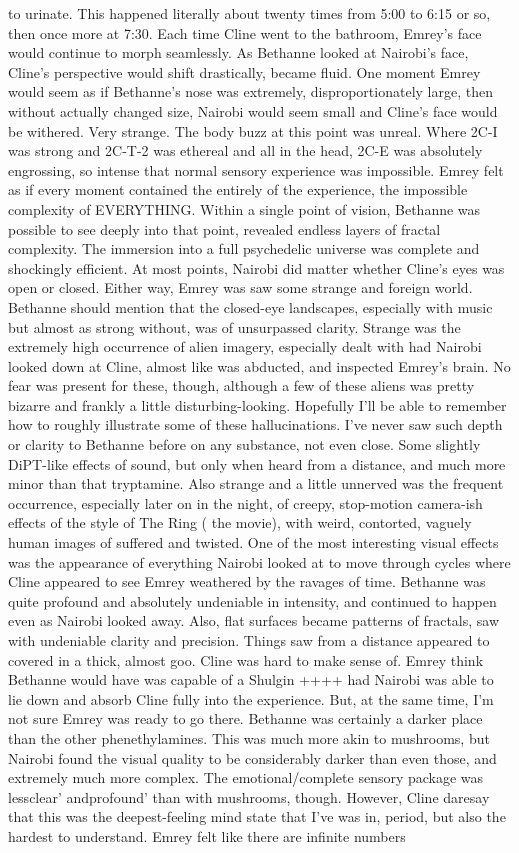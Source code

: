 \documentclass[12pt]{book}
\begin{document}
to urinate. This happened literally about twenty times from 5:00 to 6:15 or so, then once more at 7:30. Each time Cline went to the bathroom, Emrey's face would continue to morph seamlessly. As Bethanne looked at Nairobi's face, Cline's perspective would shift drastically, became fluid. One moment Emrey would seem as if Bethanne's nose was extremely, disproportionately large, then without actually changed size, Nairobi would seem small and Cline's face would be withered. Very strange. The body buzz at this point was unreal. Where 2C-I was strong and 2C-T-2 was ethereal and all in the head, 2C-E was absolutely engrossing, so intense that normal sensory experience was impossible. Emrey felt as if every moment contained the entirely of the experience, the impossible complexity of EVERYTHING. Within a single point of vision, Bethanne was possible to see deeply into that point, revealed endless layers of fractal complexity. The immersion into a full psychedelic universe was complete and shockingly efficient. At most points, Nairobi did matter whether Cline's eyes was open or closed. Either way, Emrey was saw some strange and foreign world. Bethanne should mention that the closed-eye landscapes, especially with music but almost as strong without, was of unsurpassed clarity. Strange was the extremely high occurrence of alien imagery, especially dealt with had Nairobi looked down at Cline, almost like was abducted, and inspected Emrey's brain. No fear was present for these, though, although a few of these aliens was pretty bizarre and frankly a little disturbing-looking. Hopefully I'll be able to remember how to roughly illustrate some of these hallucinations. I've never saw such depth or clarity to Bethanne before on any substance, not even close. Some slightly DiPT-like effects of sound, but only when heard from a distance, and much more minor than that tryptamine. Also strange and a little unnerved was the frequent occurrence, especially later on in the night, of creepy, stop-motion camera-ish effects of the style of The Ring ( the movie), with weird, contorted, vaguely human images of suffered and twisted. One of the most interesting visual effects was the appearance of everything Nairobi looked at to move through cycles where Cline appeared to see Emrey weathered by the ravages of time. Bethanne was quite profound and absolutely undeniable in intensity, and continued to happen even as Nairobi looked away. Also, flat surfaces became patterns of fractals, saw with undeniable clarity and precision. Things saw from a distance appeared to covered in a thick, almost goo. Cline was hard to make sense of. Emrey think Bethanne would have was capable of a Shulgin ++++ had Nairobi was able to lie down and absorb Cline fully into the experience. But, at the same time, I'm not sure Emrey was ready to go there. Bethanne was certainly a darker place than the other phenethylamines. This was much more akin to mushrooms, but Nairobi found the visual quality to be considerably darker than even those, and extremely much more complex. The emotional/complete sensory package was lessclear' andprofound' than with mushrooms, though. However, Cline daresay that this was the deepest-feeling mind state that I've was in, period, but also the hardest to understand. Emrey felt like there are infinite numbers 
\end{document}
